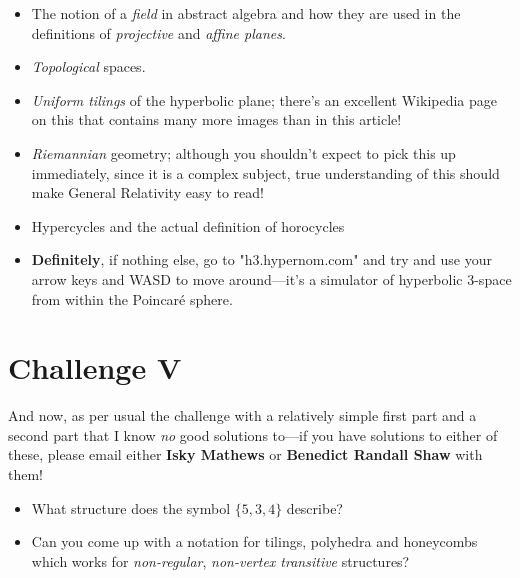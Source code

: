 \begin{multicols}{2}
\begin{itemize}
\item The notion of a \textit{field} in abstract algebra and how they are used in the definitions of \textit{projective} and \textit{affine planes}.
\item \textit{Topological} spaces.
\item \textit{Uniform tilings} of the hyperbolic plane; there's an excellent Wikipedia page on this that contains many more images than in this article!
\item \textit{Riemannian} geometry; although you shouldn't expect to pick this up immediately, since it is a complex subject, true understanding of this should make General Relativity easy to read!
\item Hypercycles and the actual definition of horocycles
\item \textbf{Definitely}, if nothing else, go to "h3.hypernom.com" and try and use your arrow keys and WASD to move around---it's a simulator of hyperbolic 3-space from within the Poincar\'{e} sphere.
\end{itemize}

\end{multicols}

\section{Challenge V}

\begin{multicols}{2}

And now, as per usual the challenge with a relatively simple first part and a second part that I know \textit{no} good solutions to---if you have solutions to either of these, please email either \textbf{Isky Mathews} or \textbf{Benedict Randall Shaw} with them!

\begin{itemize}
\item What structure does the symbol \(\{5,3,4\}\) describe?
\item Can you come up with a notation for tilings, polyhedra and honeycombs which works for \textit{non-regular}, \textit{non-vertex transitive} structures?
\end{itemize}

\end{multicols}